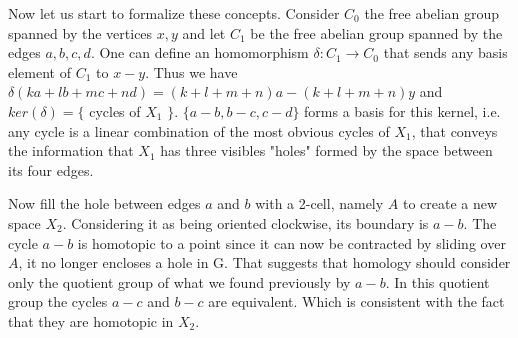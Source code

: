 \documentclass[12pt, a4paper]{article}
\begin{document}
Now let us start to formalize these concepts. Consider $C_0$ the free abelian group spanned by the vertices $x,y$ and let $C_1$ be the free abelian group spanned by the edges $a,b,c,d$. One can define an homomorphism $\delta: C_1 \to C_0$ that sends any basis element of $C_1$ to $x-y$. Thus we have $\delta(ka+lb+mc+nd) = (k+l+m+n)a - (k+l+m+n)y$ and $ker(\delta) = \{$ cycles of $X_1$ $\}$. $\{ a-b, b-c, c-d \}$ forms a basis for this kernel, i.e. any cycle is a linear combination of the most obvious cycles of $X_1$, that conveys the information that $X_1$ has three visibles "holes" formed by the space between its four edges.\\

\begin{center}
\end{center}

Now fill the hole between edges $a$ and $b$ with a 2-cell, namely $A$ to create a new space $X_2$. Considering it as being oriented clockwise, its boundary is $a-b$. The cycle $a-b$ is homotopic to a point since it can now be contracted by sliding over $A$, it no longer encloses a hole in G. That suggests that homology should consider only the quotient group of what we found previously by $a-b$. In this quotient group the cycles $a-c$ and $b-c$ are equivalent. Which is consistent with the fact that they are homotopic in $X_2$.\\
\end{document}
